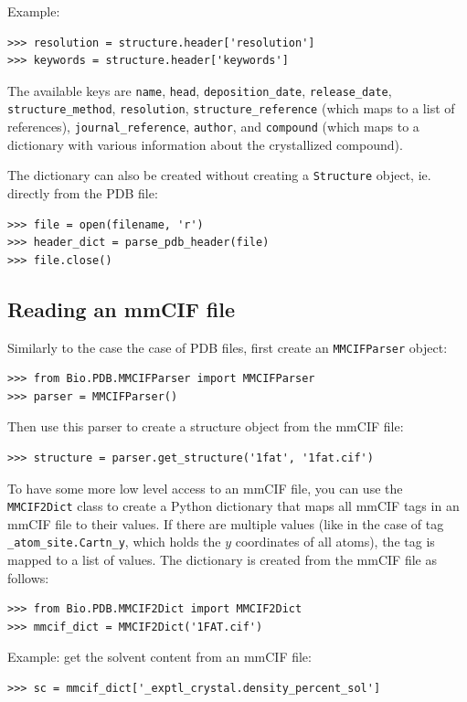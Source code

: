 \documentclass{report}
\begin{document}
Example:

\begin{verbatim}
>>> resolution = structure.header['resolution']
>>> keywords = structure.header['keywords']
\end{verbatim}
The available keys are \verb+name+, \verb+head+, \verb+deposition_date+, \verb+release_date+, \verb+structure_method+, \verb+resolution+, \verb+structure_reference+ (which maps to a list of references), \verb+journal_reference+, \verb+author+, and \verb+compound+ (which maps to a dictionary with various information about the crystallized compound).

The dictionary can also be created without creating a \texttt{Structure}
object, ie. directly from the PDB file:

\begin{verbatim}
>>> file = open(filename, 'r')
>>> header_dict = parse_pdb_header(file)
>>> file.close()
\end{verbatim}

\subsection{Reading an mmCIF file}

Similarly to the case the case of PDB files, first create an \texttt{MMCIFParser} object:

\begin{verbatim}
>>> from Bio.PDB.MMCIFParser import MMCIFParser
>>> parser = MMCIFParser()
\end{verbatim}
Then use this parser to create a structure object from the mmCIF file:
\begin{verbatim}
>>> structure = parser.get_structure('1fat', '1fat.cif')
\end{verbatim}

To have some more low level access to an mmCIF file, you can use the \verb+MMCIF2Dict+ class to create a Python dictionary that maps all mmCIF
tags in an mmCIF file to their values. If there are multiple values
(like in the case of tag \verb+_atom_site.Cartn_y+, which holds
the $y$ coordinates of all atoms), the tag is mapped to a list of values.
The dictionary is created from the mmCIF file as follows:

\begin{verbatim}
>>> from Bio.PDB.MMCIF2Dict import MMCIF2Dict
>>> mmcif_dict = MMCIF2Dict('1FAT.cif')
\end{verbatim}

Example: get the solvent content from an mmCIF file:
\begin{verbatim}
>>> sc = mmcif_dict['_exptl_crystal.density_percent_sol']
\end{verbatim}
\end{document}
